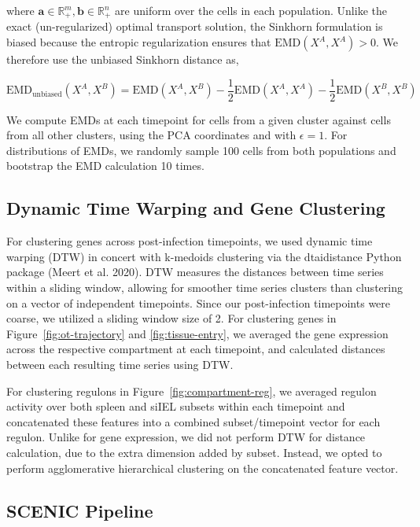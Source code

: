 where \(\mathbf{a} \in \mathbb{R}_{+}^{m},\mathbf{b} \in \mathbb{R}_{+}^{n}\) are uniform over the cells in each population. Unlike the exact (un-regularized) optimal transport solution, the Sinkhorn formulation is biased because the entropic regularization ensures that \(\mathrm{\text{EMD}}(X^{A},X^{A}) > 0\). We therefore use the unbiased Sinkhorn distance as,

\[\mathrm{\text{EMD}}_{\mathrm{\text{unbiased}}}(X^{A},X^{B}) = \mathrm{\text{EMD}}(X^{A},X^{B}) - \frac{1}{2}\mathrm{\text{EMD}}(X^{A},X^{A}) - \frac{1}{2}\mathrm{\text{EMD}}(X^{B},X^{B})\]

We compute EMDs at each timepoint for cells from a given cluster against cells from all other clusters, using the PCA coordinates and with \(\epsilon = 1\). For distributions of EMDs, we randomly sample 100 cells from both populations and bootstrap the EMD calculation 10 times.

\subsection{Dynamic Time Warping and Gene Clustering}

For clustering genes across post-infection timepoints, we used dynamic time warping (DTW) in concert with k-medoids clustering via the dtaidistance Python package (Meert et al. 2020). DTW measures the distances between time series within a sliding window, allowing for smoother time series clusters than clustering on a vector of independent timepoints. Since our post-infection timepoints were coarse, we utilized a sliding window size of 2. For clustering genes in Figure~\ref{fig:ot-trajectory} and \ref{fig:tissue-entry}, we averaged the gene expression across the respective compartment at each timepoint, and calculated distances between each resulting time series using DTW.

For clustering regulons in Figure~\ref{fig:compartment-reg}, we averaged regulon activity over both spleen and siIEL subsets within each timepoint and concatenated these features into a combined subset/timepoint vector for each regulon. Unlike for gene expression, we did not perform DTW for distance calculation, due to the extra dimension added by subset. Instead, we opted to perform agglomerative hierarchical clustering on the concatenated feature vector.

\subsection{SCENIC Pipeline}

